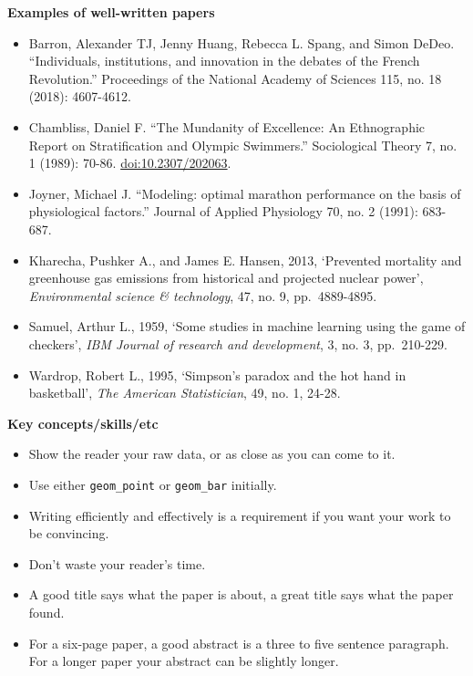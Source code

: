 \documentclass[
]{book}
\providecommand{\tightlist}{%
  \setlength{\itemsep}{0pt}\setlength{\parskip}{0pt}}
\begin{document}
\textbf{Examples of well-written papers}

\begin{itemize}
\tightlist
\item
  Barron, Alexander TJ, Jenny Huang, Rebecca L. Spang, and Simon DeDeo. ``Individuals, institutions, and innovation in the debates of the French Revolution.'' Proceedings of the National Academy of Sciences 115, no. 18 (2018): 4607-4612.
\item
  Chambliss, Daniel F. ``The Mundanity of Excellence: An Ethnographic Report on Stratification and Olympic Swimmers.'' Sociological Theory 7, no. 1 (1989): 70-86. \url{doi:10.2307/202063}.
\item
  Joyner, Michael J. ``Modeling: optimal marathon performance on the basis of physiological factors.'' Journal of Applied Physiology 70, no. 2 (1991): 683-687.
\item
  Kharecha, Pushker A., and James E. Hansen, 2013, `Prevented mortality and greenhouse gas emissions from historical and projected nuclear power', \emph{Environmental science \& technology}, 47, no. 9, pp.~4889-4895.
\item
  Samuel, Arthur L., 1959, `Some studies in machine learning using the game of checkers', \emph{IBM Journal of research and development}, 3, no. 3, pp.~210-229.
\item
  Wardrop, Robert L., 1995, `Simpson's paradox and the hot hand in basketball', \emph{The American Statistician}, 49, no. 1, 24-28.
\end{itemize}

\textbf{Key concepts/skills/etc}

\begin{itemize}
\tightlist
\item
  Show the reader your raw data, or as close as you can come to it.
\item
  Use either \texttt{geom\_point} or \texttt{geom\_bar} initially.
\item
  Writing efficiently and effectively is a requirement if you want your work to be convincing.
\item
  Don't waste your reader's time.
\item
  A good title says what the paper is about, a great title says what the paper found.
\item
  For a six-page paper, a good abstract is a three to five sentence paragraph. For a longer paper your abstract can be slightly longer.
\end{itemize}
\end{document}
